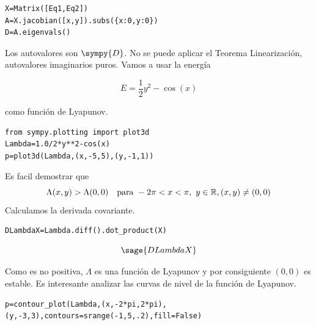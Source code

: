 \begin{lstlisting}
X=Matrix([Eq1,Eq2])
A=X.jacobian([x,y]).subs({x:0,y:0})
D=A.eigenvals()
\end{lstlisting}

Los autovalores son $\sympy{D}$. No  se puede aplicar el Teorema Linearización, autovalores imaginarios puros. Vamos a usar la energía

\[E=\frac{1}{2}y^2-\cos(x)\]

como función de Lyapunov.
\begin{lstlisting}
from sympy.plotting import plot3d
Lambda=1.0/2*y**2-cos(x)
p=plot3d(Lambda,(x,-5,5),(y,-1,1))
\end{lstlisting}
\begin{center}
\end{center}
Es facil demostrar que 
\[\Lambda(x,y)>\Lambda(0,0)\quad\hbox{para } -2\pi<x<\pi,\,\, y\in\mathbb{R},(x,y)\neq(0,0)\]
Calculamos la derivada covariante.

\begin{lstlisting}
DLambdaX=Lambda.diff().dot_product(X)
\end{lstlisting}

\[\sage{DLambdaX}\]

Como es no positiva, $\Lambda$ es una función de Lyapunov y por consiguiente $(0,0)$ es estable. Es interesante analizar las curvas de nivel de la función de Lyapunov.
\begin{lstlisting}
p=contour_plot(Lambda,(x,-2*pi,2*pi),(y,-3,3),contours=srange(-1,5,.2),fill=False)
\end{lstlisting}

\begin{center}
\end{center}


